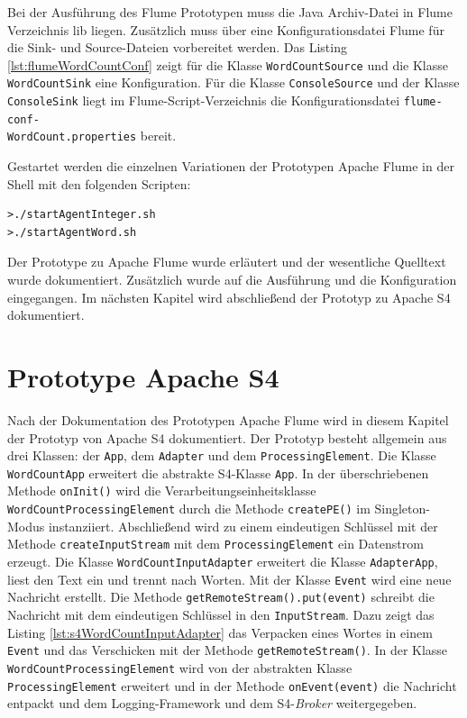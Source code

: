 Bei der Ausführung des Flume Prototypen muss die Java Archiv-Datei in Flume Verzeichnis lib liegen. Zusätzlich muss über eine Konfigurationsdatei Flume für die Sink- und Source-Dateien vorbereitet werden. Das Listing \ref{lst:flumeWordCountConf} zeigt für die Klasse \texttt{WordCountSource} und die Klasse \texttt{WordCountSink} eine Konfiguration. Für die Klasse \texttt{ConsoleSource} und der Klasse \texttt{ConsoleSink} liegt im Flume-Script-Verzeichnis die Konfigurationsdatei \texttt{flume-conf- \\WordCount.properties} bereit.



Gestartet werden die einzelnen Variationen der Prototypen Apache Flume in der Shell mit den folgenden Scripten:

\begin{verbatim}
>./startAgentInteger.sh
>./startAgentWord.sh
\end{verbatim}

Der Prototype zu Apache Flume wurde erläutert und der wesentliche Quelltext wurde dokumentiert. Zusätzlich wurde auf die Ausführung und die Konfiguration eingegangen. Im nächsten Kapitel wird abschließend der Prototyp zu Apache S4 dokumentiert.


\section{Prototype Apache S4}
\label{sec:prot:s4}

Nach der Dokumentation des Prototypen Apache Flume wird in diesem Kapitel der Prototyp von Apache S4 dokumentiert. Der Prototyp besteht allgemein aus drei Klassen: der \texttt{App}, dem \texttt{Adapter} und dem \texttt{ProcessingElement}. Die Klasse \texttt{WordCountApp} erweitert die abstrakte S4-Klasse \texttt{App}. In der überschriebenen Methode \texttt{onInit()} wird die Verarbeitungseinheitsklasse \texttt{WordCountProcessingElement} durch die Methode \texttt{createPE()} im Singleton-Modus instanziiert. Abschließend wird zu einem eindeutigen Schlüssel mit der Methode \texttt{createInputStream} mit dem \texttt{ProcessingElement} ein Datenstrom erzeugt. Die Klasse \texttt{WordCountInputAdapter} erweitert die Klasse \texttt{AdapterApp}, liest den Text ein und trennt nach Worten. Mit der Klasse \texttt{Event} wird eine neue Nachricht erstellt. Die Methode \texttt{getRemoteStream().put(event)} schreibt die Nachricht mit dem eindeutigen Schlüssel in den \texttt{InputStream}. Dazu zeigt das Listing \ref{lst:s4WordCountInputAdapter} das Verpacken eines Wortes in einem \texttt{Event} und das Verschicken mit der Methode \texttt{getRemoteStream()}. In der Klasse \texttt{WordCountProcessingElement} wird von der abstrakten Klasse \texttt{ProcessingElement} erweitert und in der Methode \texttt{onEvent(event)} die Nachricht entpackt und dem Logging-Framework und dem S4-\textit{Broker} weitergegeben.

